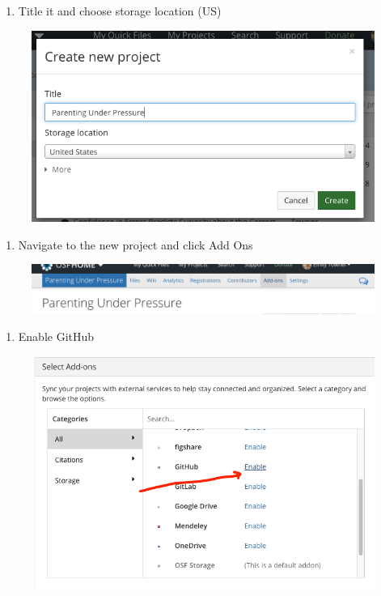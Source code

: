 \documentclass[]{book}
\providecommand{\tightlist}{%
  \setlength{\itemsep}{0pt}\setlength{\parskip}{0pt}}
\begin{document}
\begin{enumerate}
\def\labelenumi{\arabic{enumi}.}
\setcounter{enumi}{1}
\tightlist
\item
  Title it and choose storage location (US)
\end{enumerate}

\begin{figure}
\centering
\includegraphics{images/research_protocols/osf/2.png}
\caption{}
\end{figure}

\begin{enumerate}
\def\labelenumi{\arabic{enumi}.}
\setcounter{enumi}{2}
\tightlist
\item
  Navigate to the new project and click Add Ons
\end{enumerate}

\begin{figure}
\centering
\includegraphics{images/research_protocols/osf/3.png}
\caption{}
\end{figure}

\begin{enumerate}
\def\labelenumi{\arabic{enumi}.}
\setcounter{enumi}{3}
\tightlist
\item
  Enable GitHub
\end{enumerate}

\begin{figure}
\centering
\includegraphics{images/research_protocols/osf/4.png}
\caption{}
\end{figure}
\end{document}
